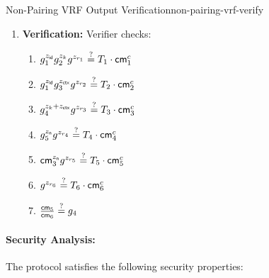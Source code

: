 \begin{protocol}{Non-Pairing VRF Output Verification}{non-pairing-vrf-verify}
\begin{enumerate}
    \item \textbf{Verification:} Verifier checks:
    \begin{enumerate}[label=(\roman*)]
        \item $g_1^{z_{\mathsf{id}}} g_2^{z_k} g^{z_{r_1}} \stackrel{?}{=} T_1 \cdot \mathsf{cm}_1^c$
        \item $g_1^{z_{\mathsf{id}}} g_3^{z_{\mathsf{ctx}}} g^{z_{r_2}} \stackrel{?}{=} T_2 \cdot \mathsf{cm}_2^c$
        \item $g_4^{z_k + z_{\mathsf{ctx}}} g^{z_{r_3}} \stackrel{?}{=} T_3 \cdot \mathsf{cm}_3^c$
        \item $g_5^{z_{\textsf{n}}} g^{z_{r_4}} \stackrel{?}{=} T_4 \cdot \mathsf{cm}_4^c$
        \item $\mathsf{cm}_3^{z_{\textsf{n}}} g^{z_{r_5}} \stackrel{?}{=} T_5 \cdot \mathsf{cm}_5^c$
        \item $g^{z_{r_6}} \stackrel{?}{=} T_6 \cdot \mathsf{cm}_6^c$
        \item $\frac{\mathsf{cm}_5}{\mathsf{cm}_6} \stackrel{?}{=} g_4$
    \end{enumerate}
\end{enumerate}
\end{protocol}








\newpage
\paragraph{Security Analysis:}
The protocol satisfies the following security properties:

